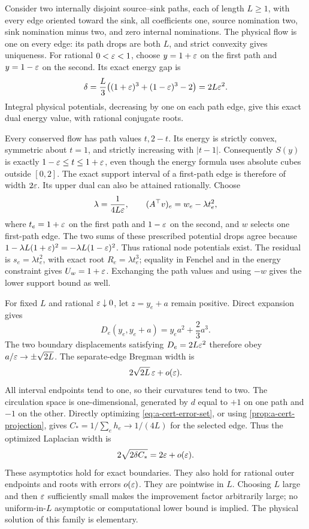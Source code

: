 \begin{example}
\label{ex:a-cert-paths}
Consider two internally disjoint source--sink paths, each of length
$L\ge1$, with every edge oriented toward the sink, all coefficients
one, source nomination two, sink nomination minus two, and zero internal
nominations. The physical flow is one on every edge: its path drops
are both $L$, and strict convexity gives uniqueness. For rational
$0<\varepsilon<1$, choose $y=1+\varepsilon$ on the first path and
$y=1-\varepsilon$ on the second. Its exact energy gap is
\begin{equation}
 \delta=\frac L3\bigl((1+\varepsilon)^3+(1-\varepsilon)^3-2\bigr)
       =2L\varepsilon^2.
 \label{eq:a-cert-path-gap}
\end{equation}
Integral physical potentials, decreasing by one on each path edge,
give this exact dual energy value, with rational conjugate roots.

Every conserved flow has path values $t,2-t$. Its energy is strictly
convex, symmetric about $t=1$, and strictly increasing with $|t-1|$.
Consequently $S(y)$ is exactly $1-\varepsilon\le t\le1+\varepsilon$,
even though the energy formula uses absolute cubes outside $[0,2]$.
The exact support interval of a first-path edge is therefore of width
$2\varepsilon$. Its upper dual can also be attained rationally. Choose
\[
 \lambda=\frac1{4L\varepsilon},\qquad
 (A^\top v)_e=w_e-\lambda t_e^2,
\]
where $t_e=1+\varepsilon$ on the first path and $1-\varepsilon$ on the second,
and $w$ selects one first-path edge. The two sums of these prescribed
potential drops agree because
$1-\lambda L(1+\varepsilon)^2=-\lambda L(1-\varepsilon)^2$.
Thus rational node potentials exist. The residual is
$s_e=\lambda t_e^2$, with exact root
$R_e=\lambda t_e^3$; equality in Fenchel and in the energy
constraint gives $U_w=1+\varepsilon$. Exchanging the path values and
using $-w$ gives the lower support bound as well.

For fixed $L$ and rational $\varepsilon\downarrow0$, let $z=y_e+a$ remain
positive. Direct expansion gives
\[
 D_e(y_e,y_e+a)=y_ea^2+\frac23a^3.
\]
The two boundary displacements satisfying $D_e=2L\varepsilon^2$
therefore obey $a/\varepsilon\to\pm\sqrt{2L}$. The separate-edge
Bregman width is
\begin{equation}
 2\sqrt{2L}\,\varepsilon+o(\varepsilon).
 \label{eq:a-cert-path-bregman}
\end{equation}
All interval endpoints tend to one, so their curvatures tend to two.
The circulation space is one-dimensional, generated by $d$ equal to
$+1$ on one path and $-1$ on the other. Directly optimizing
\eqref{eq:a-cert-error-set}, or using
\cref{prop:a-cert-projection}, gives
$C_*=1/\sum_e h_e\to1/(4L)$ for the selected edge.
Thus the optimized Laplacian width is
\begin{equation}
 2\sqrt{2\delta C_*}=2\varepsilon+o(\varepsilon).
 \label{eq:a-cert-path-hessian}
\end{equation}
These asymptotics hold for exact boundaries. They also hold for rational
outer endpoints and roots with errors $o(\varepsilon)$.
They are pointwise in $L$. Choosing $L$ large and then $\varepsilon$
sufficiently small makes the improvement factor arbitrarily large;
no uniform-in-$L$ asymptotic or computational lower bound is implied.
The physical solution of this family is elementary.
\end{example}

